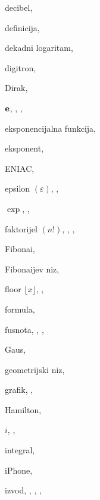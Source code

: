\begin{theindex}
  \item decibel, 
  \item definicija, 
  \item dekadni logaritam, 
  \item digitron, 
  \item Dirak, 

  \indexspace

  \item ${\bf e}$, , , 
  \item eksponencijalna funkcija, 
  \item eksponent, 
  \item ENIAC, 
  \item epsilon $(\varepsilon)$, , 
  \item $\exp$, , 

  \indexspace

  \item faktorijel $(n!)$, , , 
  \item Fibona{\cv}i, 
  \item Fibona{\cv}ijev niz, 
  \item floor $\lfloor x\rfloor$, , 
  \item formula, 
  \item fusnota, , , 

  \indexspace

  \item Gaus, 
  \item geometrijski niz, 
  \item grafik, , 

  \indexspace

  \item Hamilton, 

  \indexspace

  \item $i$, , 
  \item integral, 
  \item iPhone, 
  \item izvod, , , , 


\end{theindex}
